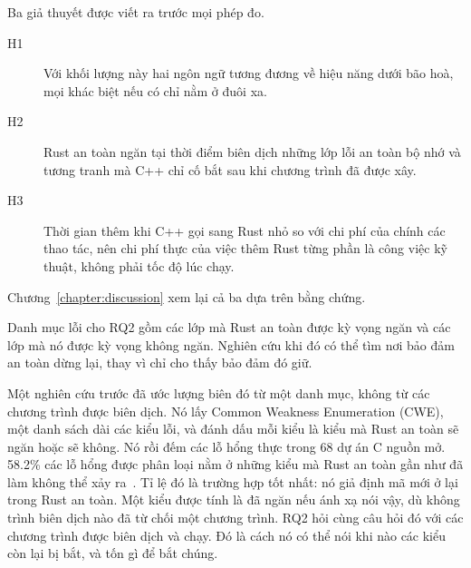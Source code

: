 Ba giả thuyết được viết ra trước mọi phép đo.
\begin{description}
  \item[H1] Với khối lượng này hai ngôn ngữ tương đương về hiệu năng dưới bão hoà, mọi khác
        biệt nếu có chỉ nằm ở đuôi xa.
  \item[H2] Rust an toàn ngăn tại thời điểm biên dịch những lớp lỗi an toàn bộ nhớ và tương
        tranh mà C++ chỉ cố bắt sau khi chương trình đã được xây.
  \item[H3] Thời gian thêm khi C++ gọi sang Rust nhỏ so với chi phí của chính các thao tác, nên
        chi phí thực của việc thêm Rust từng phần là công việc kỹ thuật, không phải tốc độ lúc
        chạy.
\end{description}
Chương~\ref{chapter:discussion} xem lại cả ba dựa trên bằng chứng.

Danh mục lỗi cho RQ2 gồm các lớp mà Rust an toàn được kỳ vọng ngăn và các lớp mà nó được kỳ
vọng không ngăn. Nghiên cứu khi đó có thể tìm nơi bảo đảm an toàn dừng lại, thay vì chỉ cho
thấy bảo đảm đó giữ.

Một nghiên cứu trước đã ước lượng biên đó từ một danh mục, không từ các chương trình được biên
dịch. Nó lấy Common Weakness Enumeration (CWE), một danh sách dài các kiểu lỗi, và đánh dấu
mỗi kiểu là kiểu mà Rust an toàn sẽ ngăn hoặc sẽ không. Nó rồi đếm các lỗ hổng thực trong 68
dự án C nguồn mở. 58.2\% các lỗ hổng được phân loại nằm ở những kiểu mà Rust an toàn gần như
đã làm không thể xảy ra~\cite{meneely2025justuserust}. Tỉ lệ đó là trường hợp tốt nhất: nó giả
định mã mới ở lại trong Rust an toàn. Một kiểu được tính là đã ngăn nếu ánh xạ nói vậy, dù
không trình biên dịch nào đã từ chối một chương trình. RQ2 hỏi cùng câu hỏi đó với các chương
trình được biên dịch và chạy. Đó là cách nó có thể nói khi nào các kiểu còn lại bị bắt, và tốn
gì để bắt chúng.
